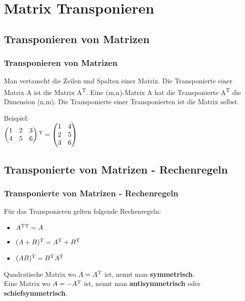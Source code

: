\section{Matrix Transponieren}
\subsection{Transponieren von Matrizen}
\begin{frame}
\frametitle{Transponieren von Matrizen}
Man vertauscht die Zeilen und Spalten einer Matrix. Die Transponierte einer Matrix A ist die Matrix A\textsuperscript{T}.
Eine (m,n)-Matrix A hat die Transponierte A\textsuperscript{T} die Dimension (n,m). Die Transponierte einer Transponierten ist die Matrix selbst.
\newline

Beispiel:\\
$\begin{pmatrix}
1 & 2 & 3\\
4 & 5 & 6
\end{pmatrix}\textsuperscript{T} = \begin{pmatrix}
1 & 4\\
2 & 5\\
3 & 6
\end{pmatrix}$

\end{frame}

\subsection{Transponierte von Matrizen - Rechenregeln}
\begin{frame}
\frametitle{Transponierte von Matrizen - Rechenregeln}
Für das Transponieren gelten folgende Rechenregeln:
\begin{itemize}
\item $A\textsuperscript{T}\textsuperscript{T} = A$
\item $(A+B)\textsuperscript{T} = A\textsuperscript{T} + B\textsuperscript{T}$
\item $(AB)\textsuperscript{T} = B\textsuperscript{T}A\textsuperscript{T}$
\end{itemize}

Quadratische Matrix wo $A = A\textsuperscript{T}$ ist, nennt man \textbf{symmetrisch}.\\
Eine Matrix wo $A = -A\textsuperscript{T}$ ist, nennt man \textbf{antisymmetrisch} oder \textbf{schiefsymmetrisch}.
\end{frame}


